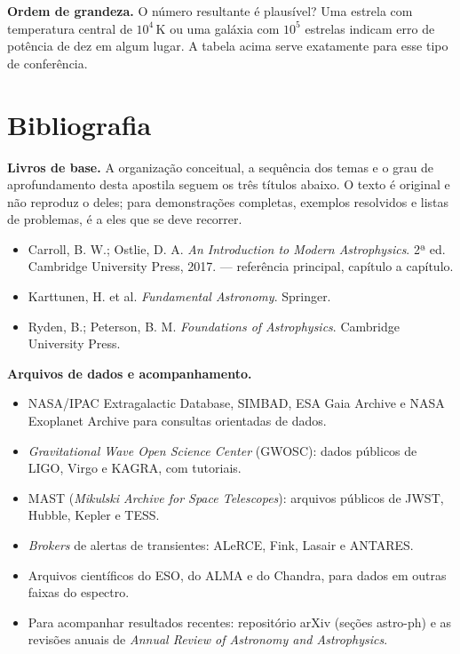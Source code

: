 \documentclass[11pt,a4paper]{article}
\begin{document}
\textbf{Ordem de grandeza.} O número resultante é plausível? Uma estrela com temperatura central de $10^{4}\,\mathrm{K}$ ou uma galáxia com $10^{5}$ estrelas indicam erro de potência de dez em algum lugar. A tabela acima serve exatamente para esse tipo de conferência.

\section*{Bibliografia}

\textbf{Livros de base.} A organização conceitual, a sequência dos temas e o grau de aprofundamento desta apostila seguem os três títulos abaixo. O texto é original e não reproduz o deles; para demonstrações completas, exemplos resolvidos e listas de problemas, é a eles que se deve recorrer.

\begin{itemize}
\item Carroll, B. W.; Ostlie, D. A. \textit{An Introduction to Modern Astrophysics}. 2ª ed. Cambridge University Press, 2017. --- referência principal, capítulo a capítulo.
\item Karttunen, H. et al. \textit{Fundamental Astronomy}. Springer.
\item Ryden, B.; Peterson, B. M. \textit{Foundations of Astrophysics}. Cambridge University Press.
\end{itemize}

\textbf{Arquivos de dados e acompanhamento.}
\begin{itemize}
\item NASA/IPAC Extragalactic Database, SIMBAD, ESA Gaia Archive e NASA Exoplanet Archive para consultas orientadas de dados.
\item \textit{Gravitational Wave Open Science Center} (GWOSC): dados públicos de LIGO, Virgo e KAGRA, com tutoriais.
\item MAST (\textit{Mikulski Archive for Space Telescopes}): arquivos públicos de JWST, Hubble, Kepler e TESS.
\item \textit{Brokers} de alertas de transientes: ALeRCE, Fink, Lasair e ANTARES.
\item Arquivos científicos do ESO, do ALMA e do Chandra, para dados em outras faixas do espectro.
\item Para acompanhar resultados recentes: repositório arXiv (seções astro-ph) e as revisões anuais de \textit{Annual Review of Astronomy and Astrophysics}.
\end{itemize}
\end{document}
